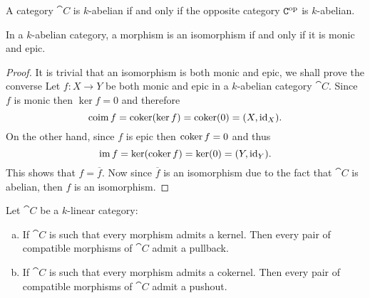 \begin{corollary}
    \label{cor:abelian-cat-iff-op-abelian}
    A category \(\cat C\) is \(k\)-abelian if and only if the opposite category
    \(\texttt C^{\mathrm{op}}\) is \(k\)-abelian.
\end{corollary}

\begin{lemma}
    \label{lem:abelian-cat-iso-iff-monic-and-epic}
    In a \(k\)-abelian category, a morphism is an isomorphism if and only if it is
    monic and epic.
\end{lemma}

\begin{proof}
    It is trivial that an isomorphism is both monic and epic, we shall prove the
    converse Let \(f: X \to Y\) be both monic and epic in a \(k\)-abelian category
    \(\cat C\). Since \(f\) is monic then \(\ker f = 0\) and therefore
    \[
        \operatorname{coim} f = \operatorname{coker}(\ker f) = \operatorname{coker}(0) = (X, \operatorname{id}_X).
    \]
    On the other hand, since \(f\) is epic then \(\operatorname{coker} f = 0\) and thus
    \[
        \operatorname{im} f = \ker(\operatorname{coker} f) = \ker(0) = (Y, \operatorname{id}_Y).
    \]
    This shows that \(f = \overline f\). Now since \(\overline f\) is an isomorphism
    due to the fact that \(\cat C\) is abelian, then \(f\) is an isomorphism.
\end{proof}

\begin{theorem}
    \label{thm:k-linear-cat-all-co-kernels-then-admits-all-pullbacks-pushouts}
    Let \(\cat C\) be a \(k\)-linear category:
    \begin{enumerate}[(a)]\setlength\itemsep{0em}
        \item If \(\cat C\) is such that every morphism admits a kernel. Then every pair
              of compatible morphisms of \(\cat C\) admit a pullback.

        \item If \(\cat C\) is such that every morphism admits a cokernel. Then every
              pair of compatible morphisms of \(\cat C\) admit a pushout.
    \end{enumerate}
\end{theorem}

